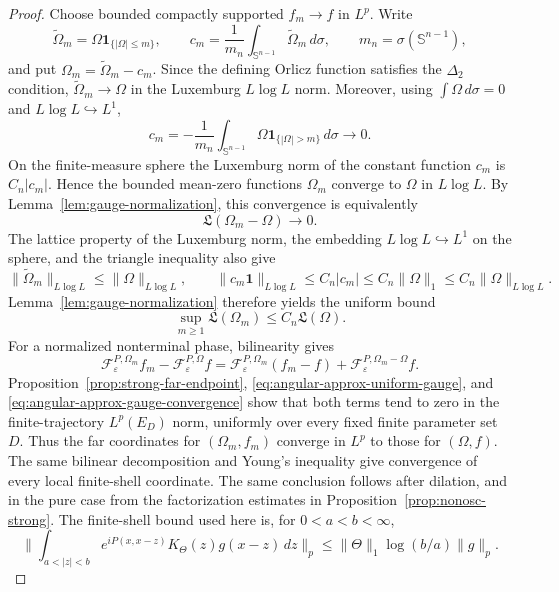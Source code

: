 \documentclass[11pt]{article}
\numberwithin{equation}{section}
\theoremstyle{remark}
\theoremstyle{definition}
\newcommand{\Sph}{\mathbb S}
\newcommand{\cF}{\mathcal F}
\newcommand{\norm}[1]{\lVert #1\rVert}
\begin{document}
\begin{proof}
Choose bounded compactly supported $f_m\to f$ in $L^p$.  Write
\[
 \widetilde\Omega_m=\Omega\mathbf1_{\{|\Omega|\leq m\}},
 \qquad
 c_m=\frac1{m_n}\int_{\Sph^{n-1}}\widetilde\Omega_m\,d\sigma,
 \qquad m_n=\sigma(\Sph^{n-1}),
\]
and put $\Omega_m=\widetilde\Omega_m-c_m$.  Since the defining Orlicz
function satisfies the $\Delta_2$ condition,
$\widetilde\Omega_m\to\Omega$ in the Luxemburg $L\log L$ norm.
Moreover, using $\int\Omega\,d\sigma=0$ and
$L\log L\hookrightarrow L^1$,
\[
 c_m=-\frac1{m_n}\int_{\Sph^{n-1}}
       \Omega\mathbf1_{\{|\Omega|>m\}}\,d\sigma\longrightarrow0.
\]
On the finite-measure sphere the Luxemburg norm of the constant function
$c_m$ is $C_n|c_m|$.  Hence the bounded mean-zero functions
$\Omega_m$ converge to $\Omega$ in $L\log L$.  By
Lemma~\ref{lem:gauge-normalization}, this convergence is equivalently
\begin{equation}\label{eq:angular-approx-gauge-convergence}
 \mathfrak L(\Omega_m-\Omega)\longrightarrow0.
\end{equation}
The lattice property of
the Luxemburg norm, the embedding $L\log L\hookrightarrow L^1$ on the
sphere, and the triangle inequality also give
\[
 \norm{\widetilde\Omega_m}_{L\log L}
 \leq\norm\Omega_{L\log L},
 \qquad
 \norm{c_m\mathbf1}_{L\log L}
 \leq C_n|c_m|
 \leq C_n\norm\Omega_1
 \leq C_n\norm\Omega_{L\log L}.
\]
Lemma~\ref{lem:gauge-normalization} therefore yields the uniform bound
\begin{equation}\label{eq:angular-approx-uniform-gauge}
 \sup_{m\geq1}\mathfrak L(\Omega_m)
 \leq C_n\mathfrak L(\Omega).
\end{equation}
For a normalized nonterminal
phase, bilinearity gives
\[
 \cF^{P,\Omega_m}_\varepsilon f_m
 -\cF^{P,\Omega}_\varepsilon f
 =
 \cF^{P,\Omega_m}_\varepsilon(f_m-f)
 +\cF^{P,\Omega_m-\Omega}_\varepsilon f.
\]
Proposition~\ref{prop:strong-far-endpoint},
\eqref{eq:angular-approx-uniform-gauge}, and
\eqref{eq:angular-approx-gauge-convergence} show that both terms tend to
zero in the finite-trajectory \(L^p(E_D)\) norm, uniformly over every
fixed finite parameter set $D$.  Thus the far coordinates for
$(\Omega_m,f_m)$ converge in $L^p$ to those for $(\Omega,f)$.
The same bilinear decomposition and Young's inequality give convergence
of every local finite-shell coordinate.
The same conclusion follows after dilation, and in the pure case from the
factorization estimates in Proposition~\ref{prop:nonosc-strong}.  The
finite-shell bound used here is, for \(0<a<b<\infty\),
\[
 \norm{\int_{a<|z|<b}e^{iP(x,x-z)}
 K_\Theta(z)g(x-z)\,dz}_p
 \leq \norm\Theta_1\log(b/a)\norm g_p.
\]
\end{proof}
\end{document}
